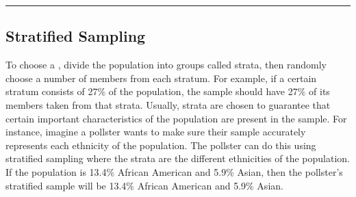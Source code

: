 \documentclass[letterpaper,10pt,english]{jupyterBook}
\begin{document}
\bigskip\hrule\bigskip



\subsection{Stratified Sampling}
\label{\detokenize{Ch1 Sampling and Data/1.3 Sampling Techniques:stratified-sampling}}
\sphinxAtStartPar
To choose a , divide the population into groups called strata, then randomly choose a  number of members from each stratum. For example, if a certain stratum consists of 27\% of the population, the sample should have 27\% of its members taken from that strata. Usually, strata are chosen to guarantee that certain important characteristics of the population are present in the sample. For instance, imagine a pollster wants to make sure their sample accurately represents each ethnicity of the population. The pollster can do this using stratified sampling where the strata are the different ethnicities of the population. If the population is 13.4\% African American and 5.9\% Asian, then the pollster’s stratified sample will be 13.4\% African American and 5.9\% Asian.
\end{document}

